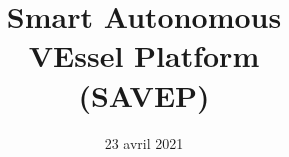 \documentclass[10pt,french]{beamer}
\title
[]
{\fontsize{11.9}{11.9}\selectfont Smart Autonomous \\VEssel Platform \\ (SAVEP)}
\author
[Projets R\&D]
{}
\institute
[Audensiel R\&D]
{Audensiel Recherche \& Développement}
\date{23 avril 2021}
\begin{document}
\mytitlepage


%

\end{document}
